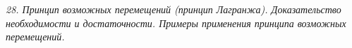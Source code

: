 \emph{28. Принцип возможных перемещений (принцип Лагранжа). Доказательство
необходимости и достаточности. Примеры применения принципа возможных
перемещений.}

\newpage %
